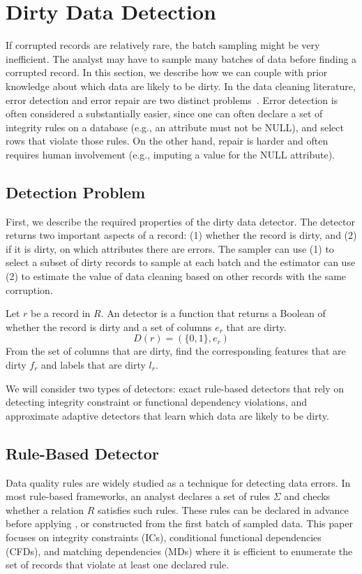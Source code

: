 \section{Dirty Data Detection}\label{det}
If corrupted records are relatively rare, the batch sampling might be very inefficient.
The analyst may have to sample many batches of data before finding a corrupted record.
In this section, we describe how we can couple \sys with prior knowledge about which data are likely to be dirty.
In the data cleaning literature, error detection and error repair are two distinct problems~\cite{DBLP:series/synthesis/2012Fan, Dasu:2003:EDM:861869, rahm2000data}.
Error detection is often considered a substantially easier, since one can often declare a set of integrity rules on a database (e.g., an attribute must not be NULL), and select rows that violate those rules.
On the other hand, repair is harder and often requires human involvement (e.g., imputing a value for the NULL attribute).

\subsection{Detection Problem}
First, we describe the required properties of the dirty data detector.
The detector returns two important aspects of a record: 
(1) whether the record is dirty, and (2) if it is dirty, on which attributes there are errors.
The sampler can use (1) to select a subset of dirty records to sample at each batch and 
the estimator can use (2) to estimate the value of data cleaning based on other records with the same corruption.

\begin{definition}[Detector]
Let $r$ be a record in $R$. An detector is a function that returns a Boolean of whether the record is dirty and a set of columns $e_r$ that are dirty.
\[
D(r) = (\{0,1\}, e_r)
\]
From the set of columns that are dirty, find the corresponding features that are dirty $f_r$ and labels that are dirty $l_r$.
\end{definition}

We will consider two types of detectors: exact rule-based detectors that rely on detecting integrity constraint or functional dependency violations, and approximate adaptive detectors that learn which data are likely to be dirty.

\subsection{Rule-Based Detector}\label{rule-det}
Data quality rules are widely studied as a technique for detecting data errors.
In most rule-based frameworks, an analyst declares a set of rules $\Sigma$ and checks whether a relation $R$ satisfies such rules.
These rules can be declared in advance before applying \sys, or constructed from the first batch of sampled data.
This paper focuses on integrity constraints (ICs), conditional functional dependencies (CFDs), and matching dependencies (MDs) where it is efficient to enumerate the set of records that violate at least one declared rule. 

